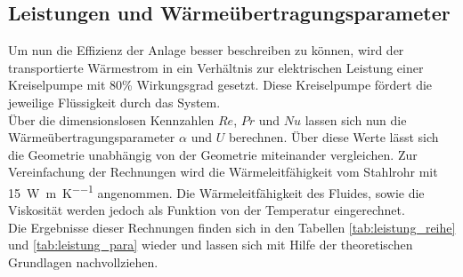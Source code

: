 \subsection{Leistungen und Wärmeübertragungsparameter}
Um nun die Effizienz der Anlage besser beschreiben zu können, wird der transportierte Wärmestrom in ein Verhältnis zur elektrischen Leistung einer Kreiselpumpe mit 80\% Wirkungsgrad gesetzt. Diese Kreiselpumpe fördert die jeweilige Flüssigkeit durch das System.\\
Über die dimensionslosen Kennzahlen $Re$, $Pr$ und $Nu$ lassen sich nun die Wärmeübertragungsparameter $\alpha $ und $U$ berechnen. Über diese Werte lässt sich die Geometrie unabhängig von der Geometrie miteinander vergleichen. Zur Vereinfachung der Rechnungen wird die Wärmeleitfähigkeit vom Stahlrohr mit \SI{15}{\watt\per\meter \per\kelvin} angenommen. Die Wärmeleitfähigkeit des Fluides, sowie die Viskosität werden jedoch als Funktion von der Temperatur eingerechnet.\\
Die Ergebnisse dieser Rechnungen finden sich in den Tabellen \ref{tab:leistung_reihe} und \ref{tab:leistung_para} wieder und lassen sich mit Hilfe der theoretischen Grundlagen nachvollziehen.
\begin{table}[h!]
	\centering
	\caption{Berechnete Leistungen, dimensionslose Kennzahlen und Wärmeübertragungsparameter der Reihenschaltung}
	\label{tab:leistung_reihe}
\end{table}%

